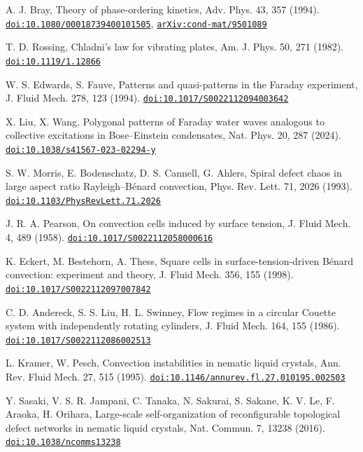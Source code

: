 \documentclass[11pt,a4paper]{article}
\begin{document}
\begin{description}[leftmargin=2.6em,labelwidth=2.2em,labelsep=0.4em,itemsep=1pt,parsep=0pt,font=\normalfont]
\item[{[9]}] A. J. Bray, Theory of phase-ordering kinetics, Adv. Phys. 43, 357 (1994). \href{https://doi.org/10.1080/00018739400101505}{\nolinkurl{doi:10.1080/00018739400101505}}, \href{https://arxiv.org/abs/cond-mat/9501089}{\nolinkurl{arXiv:cond-mat/9501089}}
\item[{[10]}] T. D. Rossing, Chladni’s law for vibrating plates, Am. J. Phys. 50, 271 (1982). \href{https://doi.org/10.1119/1.12866}{\nolinkurl{doi:10.1119/1.12866}}
\item[{[11]}] W. S. Edwards, S. Fauve, Patterns and quasi-patterns in the Faraday experiment, J. Fluid Mech. 278, 123 (1994). \href{https://doi.org/10.1017/S0022112094003642}{\nolinkurl{doi:10.1017/S0022112094003642}}
\item[{[12]}] X. Liu, X. Wang, Polygonal patterns of Faraday water waves analogous to collective excitations in Bose–Einstein condensates, Nat. Phys. 20, 287 (2024). \href{https://doi.org/10.1038/s41567-023-02294-y}{\nolinkurl{doi:10.1038/s41567-023-02294-y}}
\item[{[13]}] S. W. Morris, E. Bodenschatz, D. S. Cannell, G. Ahlers, Spiral defect chaos in large aspect ratio Rayleigh–Bénard convection, Phys. Rev. Lett. 71, 2026 (1993). \href{https://doi.org/10.1103/PhysRevLett.71.2026}{\nolinkurl{doi:10.1103/PhysRevLett.71.2026}}
\item[{[14]}] J. R. A. Pearson, On convection cells induced by surface tension, J. Fluid Mech. 4, 489 (1958). \href{https://doi.org/10.1017/S0022112058000616}{\nolinkurl{doi:10.1017/S0022112058000616}}
\item[{[15]}] K. Eckert, M. Bestehorn, A. Thess, Square cells in surface-tension-driven Bénard convection: experiment and theory, J. Fluid Mech. 356, 155 (1998). \href{https://doi.org/10.1017/S0022112097007842}{\nolinkurl{doi:10.1017/S0022112097007842}}
\item[{[16]}] C. D. Andereck, S. S. Liu, H. L. Swinney, Flow regimes in a circular Couette system with independently rotating cylinders, J. Fluid Mech. 164, 155 (1986). \href{https://doi.org/10.1017/S0022112086002513}{\nolinkurl{doi:10.1017/S0022112086002513}}
\item[{[17]}] L. Kramer, W. Pesch, Convection instabilities in nematic liquid crystals, Ann. Rev. Fluid Mech. 27, 515 (1995). \href{https://doi.org/10.1146/annurev.fl.27.010195.002503}{\nolinkurl{doi:10.1146/annurev.fl.27.010195.002503}}
\item[{[18]}] Y. Sasaki, V. S. R. Jampani, C. Tanaka, N. Sakurai, S. Sakane, K. V. Le, F. Araoka, H. Orihara, Large-scale self-organization of reconfigurable topological defect networks in nematic liquid crystals, Nat. Commun. 7, 13238 (2016). \href{https://doi.org/10.1038/ncomms13238}{\nolinkurl{doi:10.1038/ncomms13238}}

\end{description}
\end{document}
